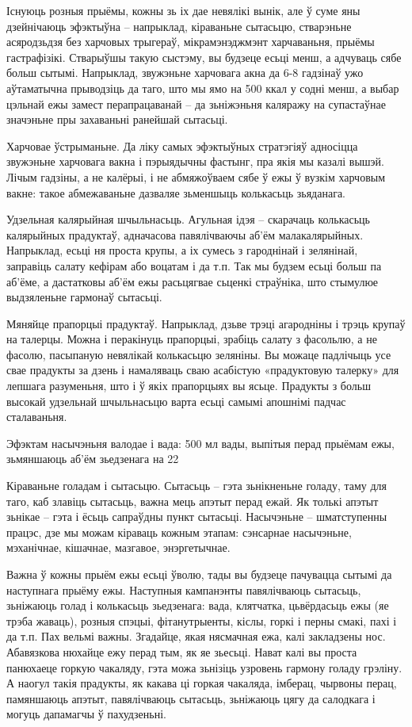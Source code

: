 Існуюць розныя прыёмы, кожны зь іх дае невялікі вынік, але ў суме яны дзейнічаюць эфэктыўна – напрыклад, кіраваньне сытасьцю, стварэньне асяродзьдзя без харчовых трыгераў, мікрамэнэджмэнт харчаваньня, прыёмы гастрафізікі. Стварыўшы такую сыстэму, вы будзеце есьці менш, а адчуваць сябе больш сытымі. Напрыклад, звужэньне харчовага акна да 6-8 гадзінаў ужо аўтаматычна прыводзіць да таго, што мы ямо на 500 ккал у содні менш, а выбар цэльнай ежы замест перапрацаванай – да зьніжэньня каляражу на супастаўнае значэньне пры захаваньні ранейшай сытасьці.

Харчовае ўстрыманьне. Да ліку самых эфэктыўных стратэгіяў адносіцца звужэньне харчовага вакна і пэрыядычны фастынг, пра якія мы казалі вышэй. Лічым гадзіны, а не калёрыі, і не абмяжоўваем сябе ў ежы ў вузкім харчовым вакне: такое абмежаваньне дазваляе зьменшыць колькасьць зьяданага.

Удзельная калярыйная шчыльнасьць. Агульная ідэя – скарачаць колькасьць калярыйных прадуктаў, адначасова павялічваючы аб'ём малакалярыйных. Напрыклад, есьці ня проста крупы, а іх сумесь з гароднінай і зелянінай, заправіць салату кефірам або воцатам і да т.п. Так мы будзем есьці больш па аб'ёме, а дастатковы аб'ём ежы расьцягвае сьценкі страўніка, што стымулюе выдзяленьне гармонаў сытасьці.

Мяняйце прапорцыі прадуктаў. Напрыклад, дзьве трэці агародніны і трэць крупаў на талерцы. Можна і перакінуць прапорцыі, зрабіць салату з фасольлю, а не фасолю, пасыпаную невялікай колькасьцю зеляніны. Вы можаце падлічыць усе свае прадукты за дзень і намаляваць сваю асабістую «прадуктовую талерку» для лепшага разуменьня, што і ў якіх прапорцыях вы ясьце. Прадукты з больш высокай удзельнай шчыльнасьцю варта есьці самымі апошнімі падчас сталаваньня.

Эфэктам насычэньня валодае і вада: 500 мл вады, выпітыя перад прыёмам ежы, зьмяншаюць аб'ём зьедзенага на 22%

Кіраваньне голадам і сытасьцю. Сытасьць – гэта зьнікненьне голаду, таму для таго, каб злавіць сытасьць, важна мець апэтыт перад ежай. Як толькі апэтыт зьнікае – гэта і ёсьць сапраўдны пункт сытасьці. Насычэньне – шматступенны працэс, дзе мы можам кіраваць кожным этапам: сэнсарнае насычэньне, мэханічнае, кішачнае, мазгавое, энэргетычнае.

Важна ў кожны прыём ежы есьці ўволю, тады вы будзеце пачувацца сытымі да наступнага прыёму ежы. Наступныя кампанэнты павялічваюць сытасьць, зьніжаюць голад і колькасьць зьедзенага: вада, клятчатка, цьвёрдасьць ежы (яе трэба жаваць), розныя спэцыі, фітанутрыенты, кіслы, горкі і перны смакі, пахі і да т.п. Пах вельмі важны. Згадайце, якая нясмачная ежа, калі закладзены нос. Абавязкова нюхайце ежу перад тым, як яе зьесьці. Нават калі вы проста панюхаеце горкую чакаляду, гэта можа зьнізіць узровень гармону голаду грэліну. А наогул такія прадукты, як какава ці горкая чакаляда, імберац, чырвоны перац, памяншаюць апэтыт, павялічваюць сытасьць, зьніжаюць цягу да салодкага і могуць дапамагчы ў пахудзеньні.

